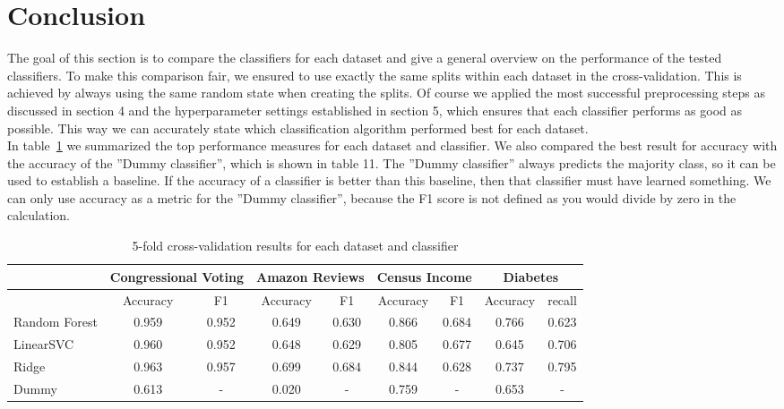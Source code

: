\documentclass[a4paper,10pt]{article}
\begin{document}
\section{Conclusion}
The goal of this section is to compare the classifiers for each dataset and give a general overview on the
performance of the tested classifiers. To make this comparison fair, we ensured to use exactly the same
splits within each dataset in the cross-validation. This is achieved by always using the same random state
when creating the splits. Of course we applied the most successful preprocessing steps as discussed in
section 4 and the hyperparameter settings established in section 5, which ensures that each classifier
performs as good as possible. This way we can accurately state which classification algorithm performed
best for each dataset.\\
In table~\ref{tab:best_results} we summarized the top performance measures for each dataset and classifier. We also compared
the best result for accuracy with the accuracy of the ”Dummy classifier”, which is shown in table 11.
The ”Dummy classifier” always predicts the majority class, so it can be used to establish a baseline. If
the accuracy of a classifier is better than this baseline, then that classifier must have learned something.
We can only use accuracy as a metric for the ”Dummy classifier”, because the F1 score is not defined as
you would divide by zero in the calculation.

\begin{table}[h!]
\centering
\footnotesize
\begin{tabular}{|l|c|c|c|c|c|c|c|c|}
\hline
& \multicolumn{2}{c|}{Congressional Voting} & \multicolumn{2}{c|}{Amazon Reviews} & \multicolumn{2}{c|}{Census Income} & \multicolumn{2}{c|}{Diabetes} \\
\hline
& Accuracy & F1 & Accuracy & F1 & Accuracy & F1 & Accuracy & recall \\
\hline
Random Forest & 0.959 & 0.952 & 0.649 & 0.630 & 0.866 & 0.684 & 0.766 & 0.623 \\
\hline
LinearSVC & 0.960 & 0.952 & 0.648 & 0.629 & 0.805 & 0.677 & 0.645 & 0.706 \\
\hline
Ridge & 0.963 & 0.957 & 0.699 & 0.684 & 0.844 & 0.628 & 0.737 & 0.795 \\
\hline
Dummy & 0.613 & - & 0.020 &- & 0.759 & - & 0.653 & - \\
\hline
\end{tabular}
\vspace{0.3cm}
\caption{5-fold cross-validation results for each dataset and classifier}
\label{tab:best_results}
\end{table}
\end{document}
